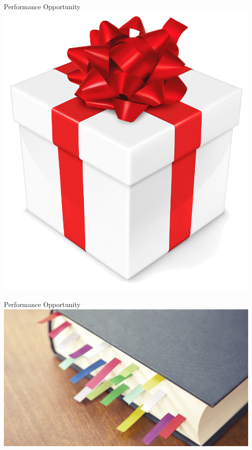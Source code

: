 \documentclass[14pt,mathserif]{beamer}
\begin{document}
\begin{frame}{Performance Opportunity}
\centering
\includegraphics[width=0.4\paperwidth]{gift}
\end{frame}

\begin{frame}{Performance Opportunity}
\centering
\includegraphics[width=0.6\paperwidth]{bookmarkbrown}
\end{frame}
\end{document}
